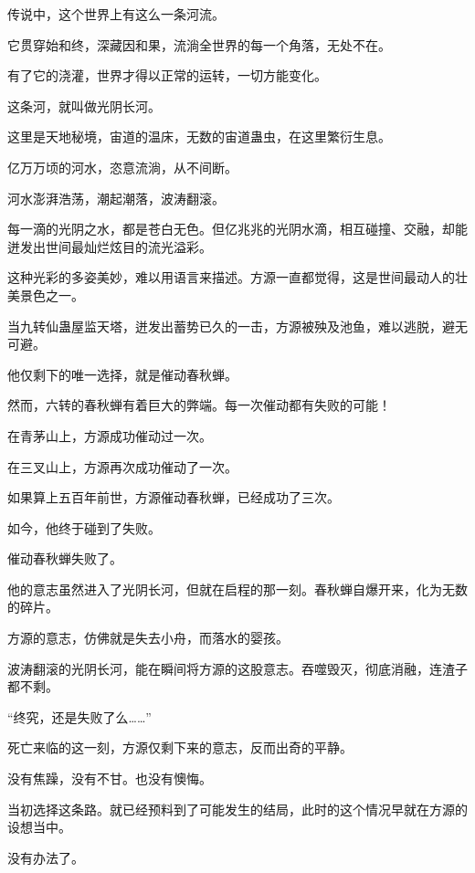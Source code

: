 
\begin{this_body}



传说中，这个世界上有这么一条河流。

它贯穿始和终，深藏因和果，流淌全世界的每一个角落，无处不在。

有了它的浇灌，世界才得以正常的运转，一切方能变化。

这条河，就叫做光阴长河。

这里是天地秘境，宙道的温床，无数的宙道蛊虫，在这里繁衍生息。

亿万万顷的河水，恣意流淌，从不间断。

河水澎湃浩荡，潮起潮落，波涛翻滚。

每一滴的光阴之水，都是苍白无色。但亿兆兆的光阴水滴，相互碰撞、交融，却能迸发出世间最灿烂炫目的流光溢彩。

这种光彩的多姿美妙，难以用语言来描述。方源一直都觉得，这是世间最动人的壮美景色之一。

当九转仙蛊屋监天塔，迸发出蓄势已久的一击，方源被殃及池鱼，难以逃脱，避无可避。

他仅剩下的唯一选择，就是催动春秋蝉。

然而，六转的春秋蝉有着巨大的弊端。每一次催动都有失败的可能！

在青茅山上，方源成功催动过一次。

在三叉山上，方源再次成功催动了一次。

如果算上五百年前世，方源催动春秋蝉，已经成功了三次。

如今，他终于碰到了失败。

催动春秋蝉失败了。

他的意志虽然进入了光阴长河，但就在启程的那一刻。春秋蝉自爆开来，化为无数的碎片。

方源的意志，仿佛就是失去小舟，而落水的婴孩。

波涛翻滚的光阴长河，能在瞬间将方源的这股意志。吞噬毁灭，彻底消融，连渣子都不剩。

“终究，还是失败了么……”

死亡来临的这一刻，方源仅剩下来的意志，反而出奇的平静。

没有焦躁，没有不甘。也没有懊悔。

当初选择这条路。就已经预料到了可能发生的结局，此时的这个情况早就在方源的设想当中。

没有办法了。


\end{this_body}
